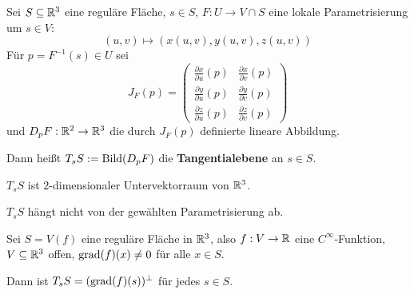 \begin{definition}\label{def:Tangentialebene}%
    Sei $S \subseteq \mathbb{R}^3$ eine reguläre Fläche, $s \in S$,
    $F: U \rightarrow V \cap S$ eine lokale Parametrisierung um $s \in V$:
    \[(u,v) \mapsto (x(u,v), y(u,v), z(u,v))\]
    Für $p=F^{-1}(s) \in U$ sei
    \[        J_F(p) = \begin{pmatrix}
            \frac{\partial x}{\partial u} (p) & \frac{\partial x}{\partial v} (p)\\
            \frac{\partial y}{\partial u} (p) & \frac{\partial y}{\partial v} (p)\\
            \frac{\partial z}{\partial u} (p) & \frac{\partial z}{\partial v} (p)
        \end{pmatrix}\]
    und $D_p F: \mathbb{R}^2 \rightarrow \mathbb{R}^3$ die durch $J_F (p)$
    definierte lineare Abbildung.

    Dann heißt $T_s S := \operatorname{Bild}(D_p F)$ die \textbf{Tangentialebene}
    an $s \in S$.
\end{definition}

\begin{bemerkung}%
    \begin{bemenum}
        \item $T_s S$ ist $2$-dimensionaler Untervektorraum von $\mathbb{R}^3$.%
        \item $T_s S$ hängt nicht von der gewählten Parametrisierung ab.%
        \item Sei $S=V(f)$ eine reguläre Fläche in $\mathbb{R}^3$, also %
                $f:V \rightarrow \mathbb{R}$ eine $C^\infty$-Funktion, $V \subseteq \mathbb{R}^3$
                offen, $\operatorname{grad}(f)(x) \neq 0$ für alle $x \in S$.

                Dann ist $T_s S = (\operatorname{grad}(f)(s))^\perp$ für jedes $s \in S$.
    \end{bemenum}
\end{bemerkung}

